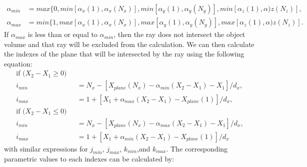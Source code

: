 \begin{equation}
\begin{aligned}
\alpha_{min} &= max\{0, min \left[ \alpha_x(1), \alpha_x(N_x) \right], min \left[ \alpha_y(1), \alpha_y(N_y) \right], min \left[ \alpha_z(1), \alpha)z (N_z) \right], \\
\alpha_{max} &= min\{1, max \left[ \alpha_x(1), \alpha_x(N_x) \right], max \left[ \alpha_y(1), \alpha_y(N_y) \right], max \left[ \alpha_z(1), \alpha)z (N_z) \right].
\end{aligned}
\label{eq:siddon_alpha_min_max}
\end{equation}
If $\alpha_{max}$ is less than or equal to $\alpha_{min}$, then the ray does not intersect the object volume and that ray will be excluded from the calculation.  We can then calculate the indexes of the plane that will be intersected by the ray using the following equation:
\begin{equation}
	\begin{aligned}
	\text{if ($X_2 - X_1 \geq 0 )$ }\\
	i_{min} &= N_x - \left[ X_{plane}(N_x) - \alpha_{min} (X_2 - X_1) - X_1 \right] /  d_x, \\
	i_{max} &= 1 + \left[ X_1 + \alpha_{max} (X_2 - X_1) - X_{plane}(1) \right] / d_x, \\
	\text{if ($X_2 - X_1 \leq 0 )$ }\\
	i_{min} &= N_x - \left[ X_{plane}(N_x) - \alpha_{max} (X_2 - X_1) - X_1 \right] /  d_x, \\
	i_{max} &= 1 + \left[ X_1 + \alpha_{min} (X_2 - X_1) - X_{plane}(1) \right] / d_x
	\end{aligned}
\label{eq:siddon_ijkminmax}
\end{equation}
with similar expressions for $j_{min}$, $j_{max}$, $k_{min}$,and $k_{max}$.  The corresponding parametric values to each indexes can be calculated by:

